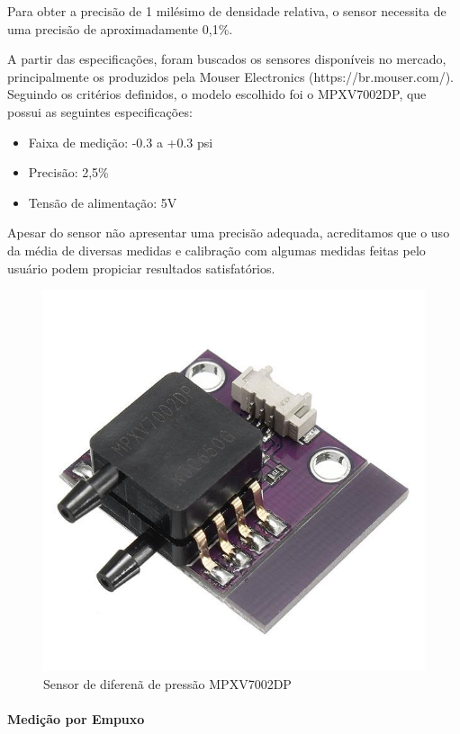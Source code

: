 Para obter a precisão de 1 milésimo de densidade relativa, o sensor necessita de uma precisão de aproximadamente 0,1\%.


A partir das especificações, foram buscados os sensores disponíveis no mercado, principalmente os produzidos pela Mouser Electronics (https://br.mouser.com/). Seguindo os critérios definidos, o modelo escolhido foi o MPXV7002DP, que possui as seguintes especificações:

\begin{itemize}
\item Faixa de medição: -0.3 a +0.3 psi
\item Precisão: 2,5\%
\item Tensão de alimentação: 5V
\end{itemize}

Apesar do sensor não apresentar uma precisão adequada, acreditamos que o uso da média de diversas medidas e calibração com algumas medidas feitas pelo usuário podem propiciar resultados satisfatórios.

\begin{figure}[h]
    \centering
    \includegraphics[scale=0.30]{figuras/projeto/hardware/MPXV7002DP.jpg}
    \caption{Sensor de diferenã de pressão MPXV7002DP}
    \label{fig:MPXV7002DP}
\end{figure}


\paragraph{Medição por Empuxo}

